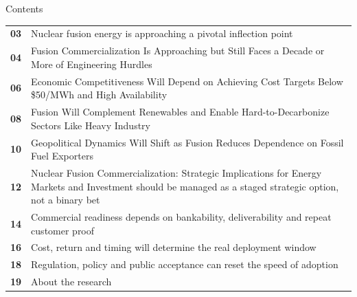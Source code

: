 \documentclass[10pt,a4paper]{article}
\begin{document}
\clearpage
{\sffamily\fontsize{26}{31}\selectfont\color{BONavy} Contents}\par\vspace{10pt}
\begin{tabularx}{\linewidth}{p{14mm}Y}
\textcolor{BOGreen}{\bfseries 03} & Nuclear fusion energy is approaching a pivotal inflection point \\[5pt]
\textcolor{BOGreen}{\bfseries 04} & Fusion Commercialization Is Approaching but Still Faces a Decade or More of Engineering Hurdles \\[5pt]
\textcolor{BOGreen}{\bfseries 06} & Economic Competitiveness Will Depend on Achieving Cost Targets Below \$50/MWh and High Availability \\[5pt]
\textcolor{BOGreen}{\bfseries 08} & Fusion Will Complement Renewables and Enable Hard-to-Decarbonize Sectors Like Heavy Industry \\[5pt]
\textcolor{BOGreen}{\bfseries 10} & Geopolitical Dynamics Will Shift as Fusion Reduces Dependence on Fossil Fuel Exporters \\[5pt]
\textcolor{BOGreen}{\bfseries 12} & Nuclear Fusion Commercialization: Strategic Implications for Energy Markets and Investment should be managed as a staged strategic option, not a binary bet \\[5pt]
\textcolor{BOGreen}{\bfseries 14} & Commercial readiness depends on bankability, deliverability and repeat customer proof \\[5pt]
\textcolor{BOGreen}{\bfseries 16} & Cost, return and timing will determine the real deployment window \\[5pt]
\textcolor{BOGreen}{\bfseries 18} & Regulation, policy and public acceptance can reset the speed of adoption \\[5pt]
\textcolor{BOGreen}{\bfseries 19} & About the research \\[5pt]
\end{tabularx}
\clearpage
\end{document}
